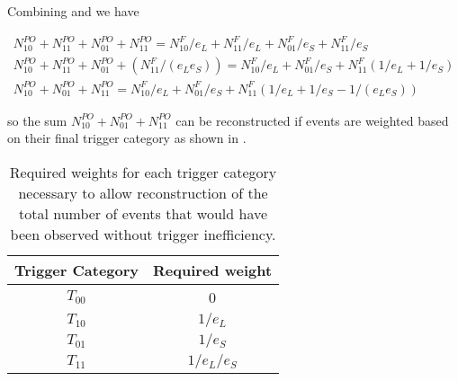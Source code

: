 \noindent Combining  and 
we have

\begin{gather}
  \label{eq:appendix:final_PO_connection}
  N^{PO}_{10} + N^{PO}_{11} + N^{PO}_{01} + N^{PO}_{11} = N^{F}_{10} / e_L + N^{F}_{11} / e_L + N^{F}_{01} / e_S + N^{F}_{11} / e_S \\
  N^{PO}_{10} + N^{PO}_{11} + N^{PO}_{01} + (N^{F}_{11}/(e_L e_S)) = N^{F}_{10} / e_L + N^{F}_{01} / e_S + N^{F}_{11} ( 1 / e_L + 1 / e_S ) \\
  N^{PO}_{10} + N^{PO}_{01} + N^{PO}_{11}  = N^{F}_{10} / e_L + N^{F}_{01} / e_S + N^{F}_{11} ( 1 / e_L + 1 / e_S - 1/(e_L e_S) )
\end{gather}

\noindent so the sum $N^{PO}_{10} + N^{PO}_{01} + N^{PO}_{11}$ can be reconstructed
if events are weighted based on their final trigger category as shown in .

\begin{table}
\begin{center}
  \begin{tabular}{ c c }
    Trigger Category & Required weight \\
    \midrule
    $T_{00}$         & 0               \\
    $T_{10}$         & $1/e_L$         \\ 
    $T_{01}$         & $1/e_S$         \\
    $T_{11}$         & $1/e_L/e_S$     \\       
  \end{tabular}
  \caption{Required weights for each trigger category necessary to allow reconstruction
           of the total number of events that would have been observed without trigger
           inefficiency.}
  \label{tab:appendix:trig_weights}
\end{center}
\end{table}
